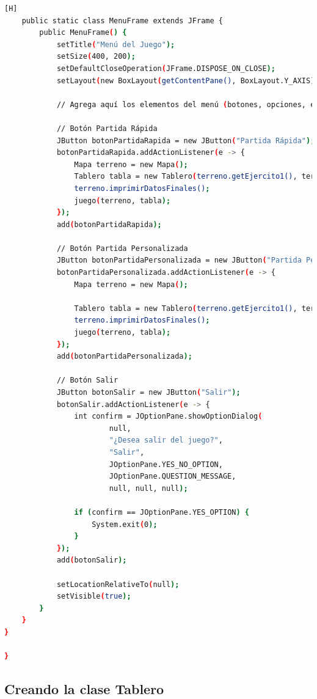 \documentclass{article}
\begin{document}
\begin{lstlisting}[language=bash,caption={CLASE MAIN o "ViDEOJUEGO"}][H]
    public static class MenuFrame extends JFrame {
        public MenuFrame() {
            setTitle("Menú del Juego");
            setSize(400, 200);
            setDefaultCloseOperation(JFrame.DISPOSE_ON_CLOSE);
            setLayout(new BoxLayout(getContentPane(), BoxLayout.Y_AXIS));  // Usar BoxLayout en eje Y

            // Agrega aquí los elementos del menú (botones, opciones, etc.)

            // Botón Partida Rápida
            JButton botonPartidaRapida = new JButton("Partida Rápida");
            botonPartidaRapida.addActionListener(e -> {
                Mapa terreno = new Mapa();
                Tablero tabla = new Tablero(terreno.getEjercito1(), terreno.getEjercito2());
                terreno.imprimirDatosFinales();
                juego(terreno, tabla);
            });
            add(botonPartidaRapida);

            // Botón Partida Personalizada
            JButton botonPartidaPersonalizada = new JButton("Partida Personalizada");
            botonPartidaPersonalizada.addActionListener(e -> {
                Mapa terreno = new Mapa();
              
                Tablero tabla = new Tablero(terreno.getEjercito1(), terreno.getEjercito2());
                terreno.imprimirDatosFinales();
                juego(terreno, tabla);
            });
            add(botonPartidaPersonalizada);

            // Botón Salir
            JButton botonSalir = new JButton("Salir");
            botonSalir.addActionListener(e -> {
                int confirm = JOptionPane.showOptionDialog(
                        null,
                        "¿Desea salir del juego?",
                        "Salir",
                        JOptionPane.YES_NO_OPTION,
                        JOptionPane.QUESTION_MESSAGE,
                        null, null, null);

                if (confirm == JOptionPane.YES_OPTION) {
                    System.exit(0);
                }
            });
            add(botonSalir);

            setLocationRelativeTo(null);
            setVisible(true);
        }
    }
}

}
	\end{lstlisting}	
	
	
	\subsection{Creando la clase Tablero}
		
\end{document}
